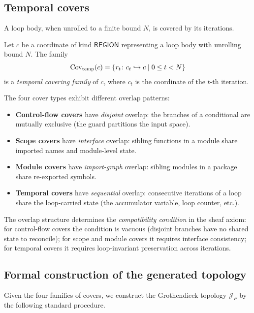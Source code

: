 \documentclass[11pt]{article}
\begin{document}
\subsection{Temporal covers}

A loop body, when unrolled to a finite bound $N$, is covered by its
iterations.

\begin{definition}\label{def:temp-cover}
Let $c$ be a coordinate of kind $\mathsf{REGION}$ representing a loop body
with unrolling bound $N$.  The family
\[
  \mathrm{Cov}_{\mathrm{temp}}(c) = \{r_t \colon c_t \hookrightarrow c \mid 0 \leq t < N\}
\]
is a \emph{temporal covering family} of $c$, where $c_t$ is the coordinate
of the $t$-th iteration.
\end{definition}

\begin{remark}
The four cover types exhibit different overlap patterns:
\begin{itemize}[nosep]
  \item \textbf{Control-flow covers} have \emph{disjoint} overlap: the branches
        of a conditional are mutually exclusive (the guard partitions the input
        space).
  \item \textbf{Scope covers} have \emph{interface} overlap: sibling functions
        in a module share imported names and module-level state.
  \item \textbf{Module covers} have \emph{import-graph} overlap: sibling modules
        in a package share re-exported symbols.
  \item \textbf{Temporal covers} have \emph{sequential} overlap: consecutive
        iterations of a loop share the loop-carried state (the accumulator
        variable, loop counter, etc.).
\end{itemize}
The overlap structure determines the \emph{compatibility condition} in the sheaf
axiom: for control-flow covers the condition is vacuous (disjoint branches have
no shared state to reconcile); for scope and module covers it requires interface
consistency; for temporal covers it requires loop-invariant preservation across
iterations.
\end{remark}

\subsection{Formal construction of the generated topology}

Given the four families of covers, we construct the Grothendieck topology
$\mathscr{J}_P$ by the following standard procedure.
\end{document}
